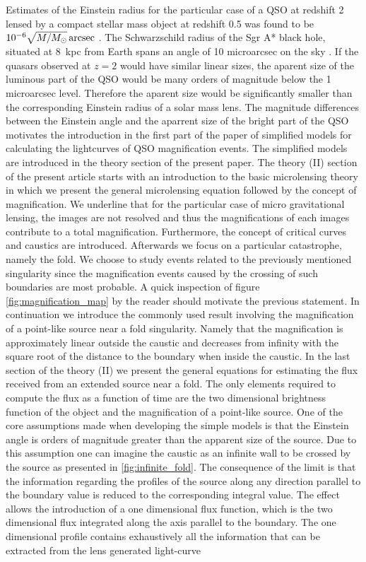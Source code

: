 Estimates of the Einstein radius for the particular case of a QSO at redshift 2 lensed by a compact stellar mass object at redshift 0.5 was found to be $10^{-6} \sqrt{M/M_\odot}\rm\,arcsec$ \citep{2001PASA...18..207W}. The Schwarzschild radius of the Sgr A* black hole, situated at 8~kpc from Earth \citep{1993ARA&A..31..345R} spans an angle of 10 microarcsec on the sky \citep{2008JPhCS.131a2055D}. If the quasars observed at $z=2$ would have similar linear sizes, the aparent size of the luminous part of the QSO would be many orders of magnitude below the 1 microarcsec level. Therefore the aparent size would be significantly smaller than the corresponding Einstein radius of a solar mass lens. 
The magnitude differences between the Einstein angle and the aparrent size of the bright part of the QSO motivates the introduction in the first part of the paper of simplified models for     
calculating the lightcurves of QSO magnification events. The simplified models are introduced in the theory section of the present paper. The theory (II) section of the present article starts with an introduction to the basic microlensing theory in which we present the general microlensing equation followed by the concept of magnification. We underline that for the particular case of micro gravitational lensing,
the images are not resolved and thus the magnifications of each images contribute to a total magnification. 
Furthermore, the concept of critical curves and caustics are introduced. Afterwards we focus on a particular catastrophe, namely the fold. 
We choose to study events related to the previously mentioned singularity since the magnification events caused by the crossing of such boundaries are most probable. A quick inspection of figure \ref{fig:magnification_map} by the reader should motivate the previous statement. 
In continuation we introduce the commonly used result involving the magnification of a point-like source near a fold singularity. 
Namely that the magnification is approximately linear outside the caustic and decreases from infinity with the square root of the distance to the boundary when inside the caustic.  
In the last section of the theory (II) we present the general equations for estimating the flux received from an extended source near a fold. 
The only elements required to compute the flux as a function of time are the two dimensional brightness function of the object and the magnification of a point-like source. 
One of the core assumptions made when developing the simple models is that the Einstein angle is orders of magnitude greater than the apparent size of the source. 
Due to this assumption one can imagine the caustic as an infinite wall to be crossed by the source as presented in \ref{fig:infinite_fold}. 
The consequence of the limit is that the information regarding the profiles of the source along any direction parallel to the boundary value is reduced to the corresponding integral value. 
The effect allows the introduction of a one dimensional flux function, which is the two dimensional flux integrated along the axis parallel to the boundary. 
The one dimensional profile contains exhaustively all the information that can be extracted  from the lens generated light-curve \\


